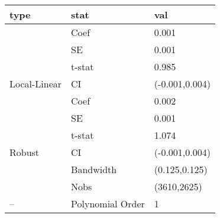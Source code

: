 
\begin{tabular}{lll}
\toprule
type & stat & val\\
\midrule
 & Coef & 0.001\\

 & SE & 0.001\\

 & t-stat & 0.985\\

\multirow{-4}{*}{\raggedright\arraybackslash Local-Linear} & CI & (-0.001,0.004)\\
\cmidrule{1-3}
 & Coef & 0.002\\

 & SE & 0.001\\

 & t-stat & 1.074\\

\multirow{-4}{*}{\raggedright\arraybackslash Robust} & CI & (-0.001,0.004)\\
\cmidrule{1-3}
 & Bandwidth & (0.125,0.125)\\

 & Nobs & (3610,2625)\\

\multirow{-3}{*}{\raggedright\arraybackslash --} & Polynomial Order & 1\\
\bottomrule
\end{tabular}